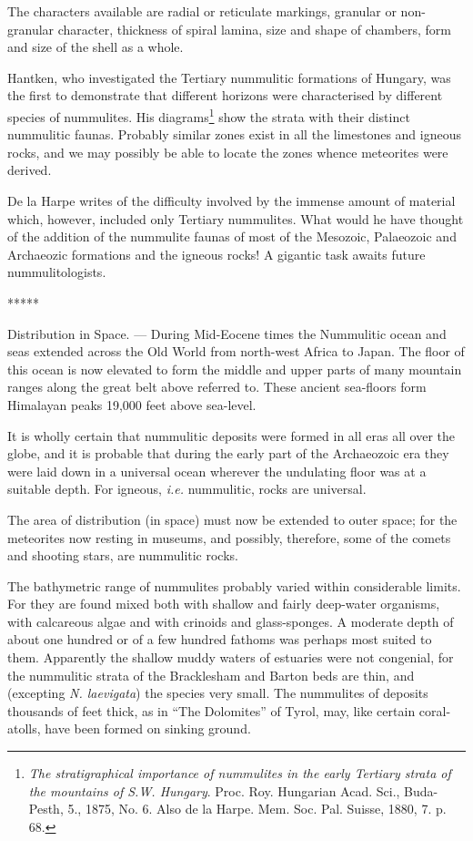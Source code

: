 \documentclass[a4paper, 12pt, oneside]{article}
\begin{document}
The characters available are radial or reticulate markings, granular or non-granular character, thickness of spiral lamina, size and shape of chambers, form and size of the shell as a whole.

Hantken, who investigated the Tertiary nummulitic formations of Hungary, was the first to demonstrate that different horizons were characterised by different species of nummulites. His diagrams\footnote{\emph{The stratigraphical importance of nummulites in the early Tertiary strata of the mountains of S.W. Hungary}. Proc. Roy. Hungarian Acad. Sci., Buda-Pesth, 5., 1875, No. 6. Also de la Harpe. Mem. Soc. Pal. Suisse, 1880, 7. p. 68.} show the strata with their distinct nummulitic faunas. Probably similar zones exist in all the limestones and igneous rocks, and we may possibly be able to locate the zones whence meteorites were derived.

De la Harpe writes of the difficulty involved by the immense amount of material which, however, included only Tertiary nummulites. What would he have thought of the addition of the nummulite faunas of most of the Mesozoic, Palaeozoic and Archaeozic formations and the igneous rocks! A gigantic task awaits future nummulitologists.

\centerline{*\hspace{15mm}*\hspace{15mm}*\hspace{15mm}*\hspace{15mm}*}
\bigskip

Distribution in Space. --- During Mid-Eocene times the Nummulitic ocean and seas extended across the Old World from north-west Africa to Japan. The floor of this ocean is now elevated to form the middle and upper parts of many mountain ranges along the great belt above referred to. These ancient sea-floors form Himalayan peaks 19,000 feet above sea-level.

It is wholly certain that nummulitic deposits were formed in all eras all over the globe, and it is probable that during the early part of the Archaeozoic era they were laid down in a universal ocean wherever the undulating floor was at a suitable depth. For igneous, \emph{i.e.} nummulitic, rocks are universal.

The area of distribution (in space) must now be extended to outer space; for the meteorites now resting in museums, and possibly, therefore, some of the comets and shooting stars, are nummulitic rocks.

The bathymetric range of nummulites probably varied within considerable limits. For they are found mixed both with shallow and fairly deep-water organisms, with calcareous algae and with crinoids and glass-sponges. A moderate depth of about one hundred or of a few hundred fathoms was perhaps most suited to them. Apparently the shallow muddy waters of estuaries were not congenial, for the nummulitic strata of the Bracklesham and Barton beds are thin, and (excepting \emph{N. laevigata}) the species very small. The nummulites of deposits thousands of feet thick, as in ``The Dolomites'' of Tyrol, may, like certain coral-atolls, have been formed on sinking ground.
\end{document}
